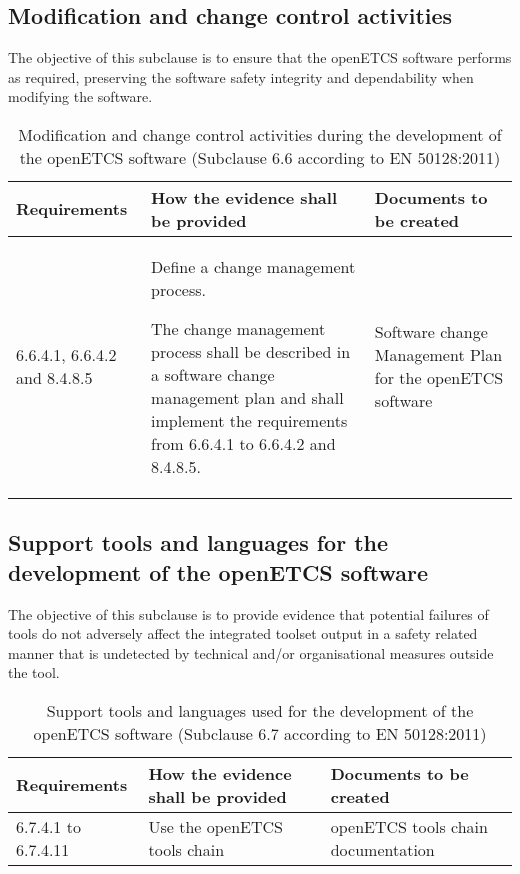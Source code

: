\documentclass{template/openetcs_report}
\begin{document}
\subsection{Modification and change control activities}
\begin{flushleft}
The objective of this subclause is to ensure that the openETCS software performs as required, preserving the software safety integrity and dependability when modifying the software.
\end{flushleft}
{\footnotesize\sffamily\centering
\begin{longtable}{|p{2cm}|p{9cm}|p{3cm}|}
\caption{Modification and change control activities during the development of the openETCS software (Subclause 6.6 according to EN 50128:2011)}\\
\hline
\bfseries Requirements & \bfseries How the evidence shall be provided & \bfseries Documents to be created\\
\hline
\hline
\endhead
\hline
\endfoot

6.6.4.1, 6.6.4.2 and 8.4.8.5 & Define a change management process.

The change management process shall be described in a  software change management plan and shall implement the requirements from 6.6.4.1 to 6.6.4.2 and 8.4.8.5.
& Software change Management Plan for the openETCS software\\ 
\hline
\end{longtable}}


\subsection{Support tools and languages for the development of the openETCS software}
\begin{flushleft}
The objective of this subclause is to provide evidence that potential failures of tools do not adversely affect the integrated toolset output in a safety related manner that is undetected by technical and/or organisational measures outside the tool.
\end{flushleft}
{\footnotesize\sffamily\centering
\begin{longtable}{|p{2cm}|p{9cm}|p{3cm}|}
\caption{Support tools and languages used for the development of the openETCS software  (Subclause 6.7 according to EN 50128:2011)}\\
\hline
\bfseries Requirements & \bfseries How the evidence shall be provided & \bfseries Documents to be created\\
\hline
\hline
\endhead
\hline
\endfoot

6.7.4.1 to 6.7.4.11 & Use the openETCS tools chain & openETCS tools chain documentation\\ 
\hline
\end{longtable}}
\end{document}
